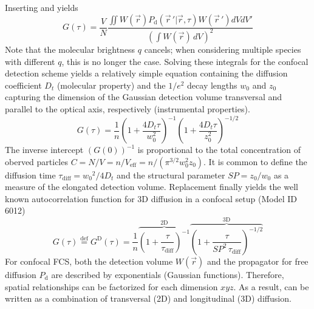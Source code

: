Inserting  and  yields
	\begin{equation}
	\label{eq8}
	G(\tau) = \frac{V}{N} \frac{\iint W(\vec{r}) P_\mathrm{d} \left( \vec{r} \,' | \vec{r},\tau \right) W(\vec{r} \,') dVdV'}{\left( \int W(\vec{r}) \,dV \right)^2}
	\end{equation}
Note that the molecular brightness $q$ cancels; when considering multiple species with different $q$, this is no longer the case.
Solving these integrals for the confocal detection scheme yields a relatively simple equation containing the diffusion coefficient $D_t$ (molecular property) and the $1/e^2$ decay lengths $w_0$ and $z_0$ capturing the dimension of the Gaussian detection volume transversal and parallel to the optical axis, respectively (instrumental properties).
	\begin{equation}
	\label{eq9}
	G(\tau) = \frac{1}{n} \left(1+\frac{4 D_t \tau}{w_0^2} \right) ^{-1} \left(1+\frac{4D_t \tau}{z_0^2} \right)^{-1/2}
	\end{equation}
The inverse intercept $(G(0))^{-1}$ is proportional to the total concentration of oberved particles $C = N/V =  n/V_{\mathrm{eff}} = n/ (\pi^{3/2}w_0^2z_0)$. It is common to define the diffusion time $\tau_{\mathrm{diff}} = {w_0}^2/4D_t$ and the structural parameter $\textit{SP}=z_0/w_0$ as a measure of the elongated detection volume. Replacement finally yields the well known autocorrelation function for 3D diffusion in a confocal setup (Model ID 6012)
	\begin{equation}
	\label{eq10}
	G(\tau) \stackrel{\mathrm{def}}{=} G^{\mathrm{D}}(\tau) = \frac{1}{n} \overbrace{ \left(1+\frac{\tau}{\tau_{\mathrm{diff}}} \right) ^{-1}}^{\mathrm{2D}} \overbrace{ \left(1+\frac{\tau}{\textit{SP}^2 \, \tau_{\mathrm{diff}}} \right)^{-1/2}}^{\mathrm{3D}}
	\end{equation}
For confocal FCS, both the detection volume $W(\vec{r})$ and the propagator for free diffusion $P_\mathrm{d}$ are described by exponentials (Gaussian functions). Therefore, spatial relationships can be factorized for each dimension $xyz$. As a result,  can be written as a combination of transversal (2D) and longitudinal (3D) diffusion.

